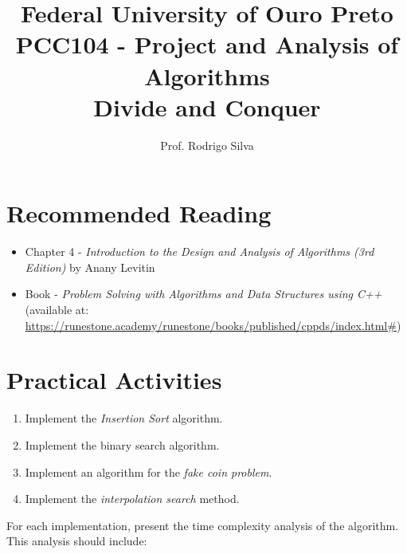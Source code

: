 \documentclass{article}
\title{\vspace{-2 cm}Federal University of Ouro Preto \\ PCC104 - Project and Analysis of Algorithms \\ Divide and Conquer}
\author{Prof. Rodrigo Silva}
\date{}
\begin{document}
\maketitle

\section{Recommended Reading}

\begin{itemize}
    \item Chapter 4 - \textit{Introduction to the Design and Analysis of Algorithms (3rd Edition)} by Anany Levitin
    \item Book - \textit{Problem Solving with Algorithms and Data Structures using C++} (available at: \url{https://runestone.academy/runestone/books/published/cppds/index.html#})
\end{itemize}

\section{Practical Activities}

\begin{enumerate}
    \item Implement the \textit{Insertion Sort} algorithm.
    \item Implement the binary search algorithm.
    \item Implement an algorithm for the \textit{fake coin problem}.
    \item Implement the \textit{interpolation search} method.
\end{enumerate}

For each implementation, present the time complexity analysis of the algorithm. This analysis should include:
\end{document}
